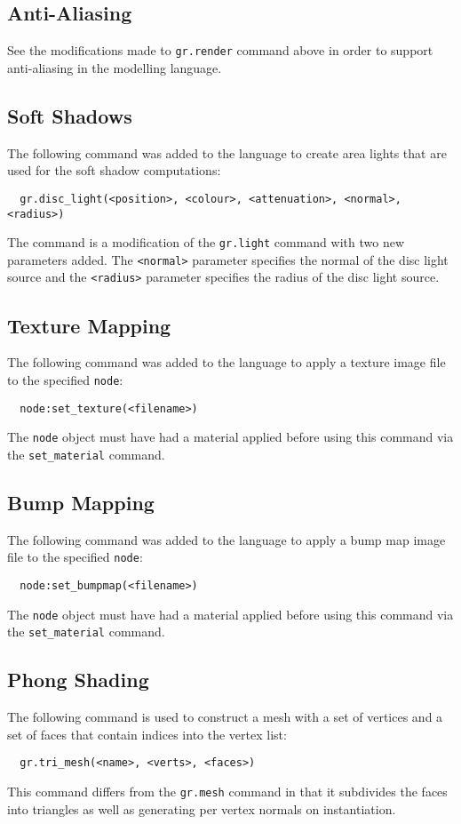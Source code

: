 \subsection*{Anti-Aliasing}
See the modifications made to \verb|gr.render| command above in order to support
anti-aliasing in the modelling language.

\subsection*{Soft Shadows}
The following command was added to the language to create area lights that are
used for the soft shadow computations:
\begin{verbatim}
  gr.disc_light(<position>, <colour>, <attenuation>, <normal>, <radius>)
\end{verbatim}
The command is a modification of the \verb|gr.light| command with two new
parameters added. The \verb|<normal>| parameter specifies the normal of the disc
light source and the \verb|<radius>| parameter specifies the radius of the disc
light source.

\subsection*{Texture Mapping}
The following command was added to the language to apply a texture image file
to the specified \verb|node|:
\begin{verbatim}
  node:set_texture(<filename>)
\end{verbatim}
The \verb|node| object must have had a material applied before using this
command via the \verb|set_material| command.

\subsection*{Bump Mapping}
The following command was added to the language to apply a bump map image file
to the specified \verb|node|:
\begin{verbatim}
  node:set_bumpmap(<filename>)
\end{verbatim}
The \verb|node| object must have had a material applied before using this
command via the \verb|set_material| command.

\subsection*{Phong Shading}
The following command is used to construct a mesh with a set of vertices and a
set of faces that contain indices into the vertex list:
\begin{verbatim}
  gr.tri_mesh(<name>, <verts>, <faces>)
\end{verbatim}
This command differs from the \verb|gr.mesh| command in that it subdivides the
faces into triangles as well as generating per vertex normals on instantiation.

